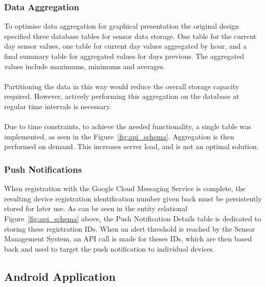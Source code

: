\documentclass{article}
\begin{document}
\subsubsection{Data Aggregation}
To optimise data aggregation for graphical presentation the original design specified three database tables for sensor data storage. One table for the current day sensor values, one table for current day values aggregated by hour, and a final summary table for aggregated values for days previous. The aggregated values include maximums, minimums and averages. \\\\
Partitioning the data in this way would reduce the overall storage capacity required. However, actively performing this aggregation on the database at regular time intervals is necessary.\\\\
Due to time constraints, to achieve the needed functionality, a single table was implemented, as seen in the Figure~\ref{fig:api_schema}. Aggregation is then performed on demand. This increases server load, and is not an optimal solution. 

\subsubsection{Push Notifications}
When registration with the Google Cloud Messaging Service is complete, the resulting device registration identification number given back must be persistently stored for later use. As can be seen in the entity relational Figure~\ref{fig:api_schema} above, the Push Notification Details table is dedicated to storing these registration IDs. When an alert threshold is reached by the Sensor Management System, an API call is made for theses IDs, which are then based back and used to target the push notification to individual devices. 

\subsection{Android Application}
\end{document}
